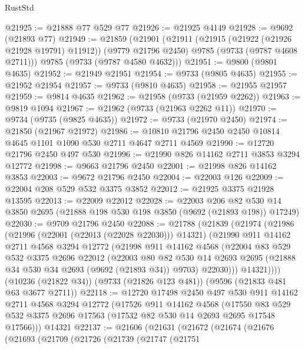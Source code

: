 \begin{lexlean}{RustStd}
\begin{coremodule}
@21925 := @21888 @77 @529 @77
@21926 := @21925 @4149
@21928 := @9692 (@21893 @77)
@21949 := @21859
    (@21901
      (@21911
        (@21915 (@21922 (@21926 @21928 @19791) @11912))
        (@9779 @21796 @2450)
        @9785
        (@9733 (@9787 @4608 @2711)))
      @9785
      (@9733 (@9787 @4580 @4632)))
@21951 := @9800 (@9801 @4635)
@21952 := @21949 @21951
@21954 := @9733 (@9805 @4635)
@21955 := @21952 @21954
@21957 := @9733 (@9810 @4635)
@21958 := @21955 @21957
@21959 := @9814 @4635
@21962 := @21958 (@9733 (@21959 @2262))
@21963 := @9819 @1094
@21967 := @21962 (@9733 (@21963 @2262 @11))
@21970 := @9734 (@9735 (@9825 @4635))
@21972 := @9733 (@21970 @2450)
@21974 := @21850 (@21967 @21972)
@21986 := @10810 @21796 @2450 @2450 @10814 @4645 @1101 @1090 @530 @2711 @4647 @2711 @4569
@21990 := @12720 @21796 @2450 @497 @530
@21996 := @21990 @826 @14162 @2711 @3853 @3294 @12772
@21998 := @9663 @21796 @2450
@22001 := @21998 @826 @14162 @3853
@22003 := @9672 @21796 @2450
@22004 := @22003 @126
@22009 := @22004 @208 @529 @532 @3375 @3852
@22012 := @21925 @3375 @21928 @13595
@22013 := @22009 @22012
@22028 := @22003
    @206
    @82
    @530
    @14
    @3850
    @2695
    (@21888 @198 @530 @198 @3850 (@9692 (@21893 @198)) @17249)
@22030 := @9709 @21796 @2450
@22088 := @21788
    (@21839
      (@21974
        (@21986
          (@21996 (@22001 (@22013 (@22028 @22030))) @14321)
          (@21990
            @911
            @14162
            @2711
            @4568
            @3294
            @12772
            (@21998
              @911
              @14162
              @4568
              (@22004
                @83
                @529
                @532
                @3375
                @2696
                @22012
                (@22003
                  @80
                  @82
                  @530
                  @14
                  @2693
                  @2695
                  (@21888 @34 @530 @34 @2693 (@9692 (@21893 @34)) @9703)
                  @22030)))
            @14321))))
    (@10236 (@21822 @34))
    (@9733 (@21826 @123 @481))
    (@9596 (@21833 @481 @63 @3677 @2711))
@22118 := @12720
    @17498
    @2450
    @497
    @530
    @911
    @14162
    @2711
    @4568
    @3294
    @12772
    (@17526
      @911
      @14162
      @4568
      (@17550 @83 @529 @532 @3375 @2696 @17563 (@17532 @82 @530 @14 @2693 @2695 @17548 @17566)))
    @14321
@22137 := @21606
    (@21631
      (@21672
        (@21674
          (@21676
            (@21693
              (@21709
                (@21726
                  (@21739
                    (@21747
                      (@21751

\end{coremodule}
\end{lexlean}
